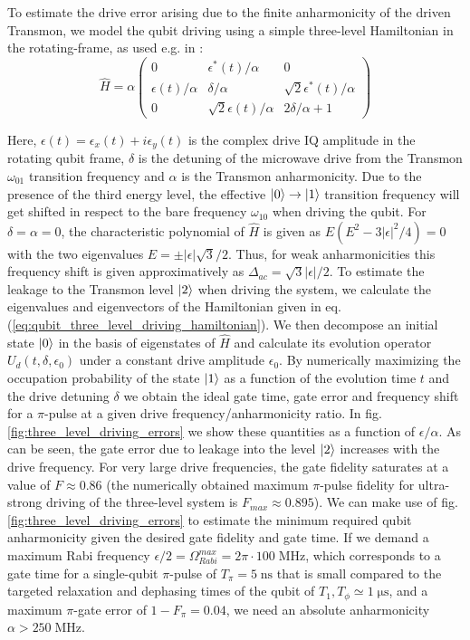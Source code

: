 \smallskip

To estimate the drive error arising due to the finite anharmonicity of the driven Transmon, we model the qubit driving using a simple three-level Hamiltonian in the rotating-frame, as used e.g. in \cite{motzoi_simple_2009}:
%
\begin{equation}
\hat{H} = \alpha\left(
						 \begin{array}{ccc}
						0 & \epsilon^*(t)/\alpha & 0 \\
						\epsilon(t)/\alpha & \delta/\alpha & \sqrt{2}\epsilon^*(t)/\alpha \\
						0 & \sqrt{2}\epsilon(t)/\alpha & 2\delta/\alpha + 1
						\end{array}
					\right) \label{eq:qubit_three_level_driving_hamiltonian}
\end{equation}
%

Here, $\epsilon(t) = \epsilon_x(t)+i\epsilon_y(t)$ is the complex drive IQ amplitude in the rotating qubit frame, $\delta$ is the detuning of the microwave drive from the Transmon $\omega_{01}$ transition frequency and $\alpha$ is the Transmon anharmonicity. Due to the presence of the third energy level, the effective $\left| 0 \right>\to\left| 1 \right>$ transition frequency will get shifted in respect to the bare frequency $\omega_{10}$ when driving the qubit. For $\delta = \alpha = 0$, the characteristic polynomial of $\hat{H}$ is given as $E(E^2-3|\epsilon|^2/4) = 0$ with the two eigenvalues $E=\pm |\epsilon|\sqrt{3}/2$. Thus, for weak anharmonicities this frequency shift is given approximatively as $\Delta_{ac}=\sqrt{3}|\epsilon|/2$. To estimate the leakage to the Transmon level $\left| 2 \right>$ when driving the system, we calculate the eigenvalues and eigenvectors of the Hamiltonian given in eq. (\ref{eq:qubit_three_level_driving_hamiltonian}). We then decompose an initial state $\left| 0 \right>$ in the basis of eigenstates of $\hat{H}$ and calculate its evolution operator $U_d(t,\delta,\epsilon_0)$ under a constant drive amplitude $\epsilon_0$. By numerically maximizing the occupation probability of the state $\left| 1 \right>$ as a function of the evolution time $t$ and the drive detuning $\delta$ we obtain the ideal gate time, gate error and frequency shift for a $\pi$-pulse at a given drive frequency/anharmonicity ratio. In fig. \ref{fig:three_level_driving_errors} we show these quantities as a function of $\epsilon/\alpha$. As can be seen, the gate error due to leakage into the level $\left| 2 \right>$ increases with the drive frequency. For very large drive frequencies, the gate fidelity saturates at a value of $F\approx 0.86$ (the numerically obtained maximum $\pi$-pulse fidelity for ultra-strong driving of the three-level system is $F_{max}\approx 0.895$). We can make use of fig. \ref{fig:three_level_driving_errors} to estimate the minimum required qubit anharmonicity given the desired gate fidelity and gate time. If we demand a maximum Rabi frequency $\epsilon/2=\Omega_{Rabi}^{max}=2\pi\cdot 100\;\mathrm{MHz}$, which corresponds to a gate time for a single-qubit $\pi$-pulse of $T_\pi=5\;\mathrm{ns}$ that is small compared to the targeted relaxation and dephasing times of the qubit of $T_1,T_\phi\simeq 1\;\mathrm{\mu s}$, and a maximum $\pi$-gate error of $1-F_\pi = 0.04$, we need an absolute anharmonicity $\alpha > 250\;\mathrm{MHz}$.

